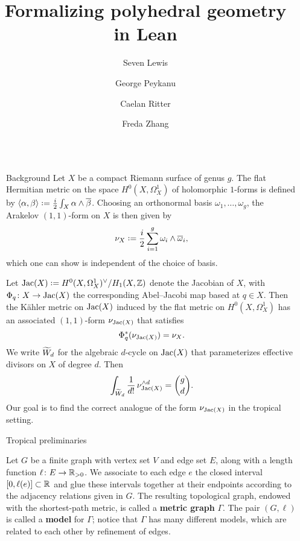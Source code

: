 \documentclass[final]{beamer}
\title{Formalizing polyhedral geometry in Lean}
\author{Seven Lewis \and George Peykanu \and Caelan Ritter \and Freda Zhang}
\institute[]{University of Washington}
\newcommand*{\defn}[1]{\textbf{#1}}
\newlength{\sepwidth}
\newlength{\colwidth}
\newcommand{\separatorcolumn}{\begin{column}{\sepwidth}\end{column}}
\begin{document}
\begin{frame}[t]
\begin{columns}[t]
\separatorcolumn

\begin{column}{\colwidth}

\begin{block}{Background}
Let $X$ be a compact Riemann surface of genus $g$.  The flat Hermitian metric on the space $H^{0}(X,\Omega_{X}^{1})$ of holomorphic $1$-forms is defined by $\ang{\alpha,\beta} \defeq \frac{i}{2}\int_{X} \alpha \wedge \overline{\beta}$.  Choosing an orthonormal basis $\omega_{1}, \ldots, \omega_{g}$, the Arakelov $(1,1)$-form on $X$ is then given by
\begin{equation}
  \nu_{X} \defeq \frac{i}{2} \sum_{i=1}^{g} \omega_{i} \wedge \overline{\omega}_{i},
\end{equation}
which one can show is independent of the choice of basis.

Let $\Jac(X) \defeq H^{0}(X,\Omega_{X}^{1})^{\vee}/H_{1}(X,\ZZ)$ denote the Jacobian of $X$, with $\Phi_{q} \maps X \to \Jac(X)$ the corresponding Abel--Jacobi map based at $q \in X$.  Then the K\"ahler metric on $\operatorname{Jac}(X)$ induced by the flat metric on $H^{0}(X,\Omega_{X}^{1})$ has an associated $(1,1)$-form $\nu_{\operatorname{Jac}(X)}$ that satisfies
\begin{equation}\label{eq:pullback}
  \Phi_{q}^{*}(\nu_{\operatorname{Jac}(X)}) = \nu_{X}.
\end{equation}
We write $\widetilde W_{d}$ for the algebraic $d$-cycle on $\operatorname{Jac}(X)$ that parameterizes effective divisors on $X$ of degree $d$.  Then
\begin{equation}\label{eq:integral}
  \int_{\widetilde W_{d}} \frac{1}{d!}\,\nu_{\operatorname{Jac}(X)}^{\wedge d} = \binom{g}{d}.
\end{equation}
Our goal is to find the correct analogue of the form $\nu_{\operatorname{Jac}(X)}$ in the tropical setting.
\end{block}

\begin{block}{Tropical preliminaries}

Let $G$ be a finite graph with vertex set $V$ and edge set $E$, along with a length function $\ell \maps E \to \RR_{>0}$.  We associate to each edge $e$ the closed interval $[0,\ell(e)] \subset \mathbb{R}$ and glue these intervals together at their endpoints according to the adjacency relations given in $G$.  The resulting topological graph, endowed with the shortest-path metric, is called a \defn{metric graph} $\Gamma$.  The pair $(G,\ell)$ is called a \defn{model} for $\Gamma$; notice that $\Gamma$ has many different models, which are related to each other by refinement of edges.


\end{block}
\end{column}
\end{columns}
\end{frame}
\end{document}
